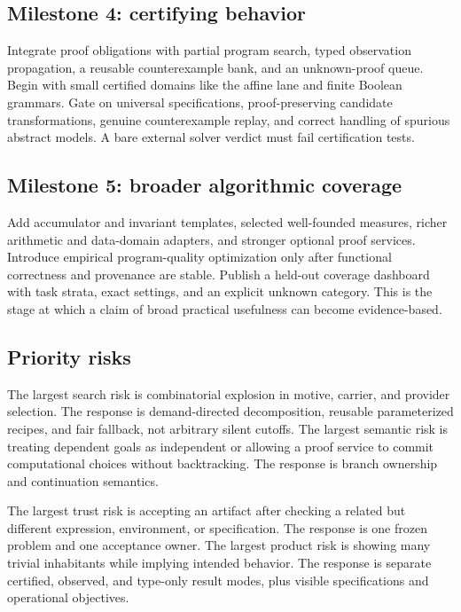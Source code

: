 \subsection{Milestone 4: certifying behavior}

Integrate proof obligations with partial program search, typed observation propagation, a reusable counterexample bank, and an unknown-proof queue. Begin with small certified domains like the affine lane and finite Boolean grammars. Gate on universal specifications, proof-preserving candidate transformations, genuine counterexample replay, and correct handling of spurious abstract models. A bare external solver verdict must fail certification tests.

\subsection{Milestone 5: broader algorithmic coverage}

Add accumulator and invariant templates, selected well-founded measures, richer arithmetic and data-domain adapters, and stronger optional proof services. Introduce empirical program-quality optimization only after functional correctness and provenance are stable. Publish a held-out coverage dashboard with task strata, exact settings, and an explicit unknown category. This is the stage at which a claim of broad practical usefulness can become evidence-based.

\subsection{Priority risks}

The largest search risk is combinatorial explosion in motive, carrier, and provider selection. The response is demand-directed decomposition, reusable parameterized recipes, and fair fallback, not arbitrary silent cutoffs. The largest semantic risk is treating dependent goals as independent or allowing a proof service to commit computational choices without backtracking. The response is branch ownership and continuation semantics.

The largest trust risk is accepting an artifact after checking a related but different expression, environment, or specification. The response is one frozen problem and one acceptance owner. The largest product risk is showing many trivial inhabitants while implying intended behavior. The response is separate certified, observed, and type-only result modes, plus visible specifications and operational objectives.

